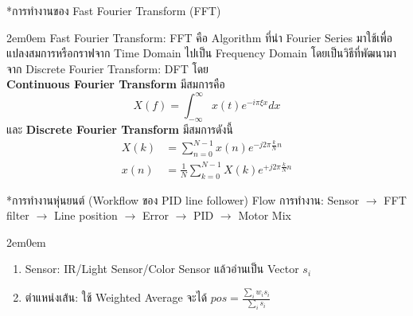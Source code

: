 \documentclass[14pt, fleqn, a4paper]{extarticle}
\makeatletter
\renewcommand\subsection{%
  \@ifstar{\flatsubsection}{\@subsection}%
}
\newcommand{\flatsubsection}[1]{%
   \par\medskip
   {\bfseries #1\par}
}
\makeatother
\begin{document}
\subsection*{การทำงานของ Fast Fourier Transform (FFT)}
\begin{adjustwidth}{2em}{0em}
	\indent Fast Fourier Transform: FFT คือ Algorithm ที่นำ Fourier Series มาใช้เพื่อแปลงสมการหรือกราฟจาก Time Domain ไปเป็น Frequency Domain โดยเป็นวิธีที่พัฒนามาจาก Discrete Fourier Transform: DFT โดย \\[0.2em]
	\textbf{Continuous Fourier Transform} มีสมการคือ
	\[
		X(f) = \int_{-\infty}^{\infty} x(t) e^{-i \pi \xi x} dx
	\]
	และ \textbf{Discrete Fourier Transform} มีสมการดังนี้ 
	\begin{align*}
		X(k) &= \sum_{n = 0}^{N - 1} x(n) e^{-j 2 \pi \frac{k}{N} n} \\[0.5em]
		x(n) &= \frac{1}{N} \sum_{k = 0}^{N - 1} X(k) e^{+j 2 \pi \frac{k}{N} n}
	\end{align*}
\end{adjustwidth}

\subsection*{การทำงานหุ่นยนต์ (Workflow ของ PID line follower)}
Flow การทำงาน: Sensor $\rightarrow$ FFT filter $\rightarrow$ Line position $\rightarrow$ Error $\rightarrow$ PID $\rightarrow$ Motor Mix
\begin{adjustwidth}{2em}{0em}
	\begin{enumerate}
		\item Sensor: IR/Light Sensor/Color Sensor แล้วอ่านเป็น Vector $s_i$
		\item ตำแหน่งเส้น: ใช้ Weighted Average จะได้ $\displaystyle \mathit{pos} = \frac{\sum_{i} w_i s_i}{\sum_{i} s_i}$
	\end {enumerate}
\end{adjustwidth}

\end{document}
